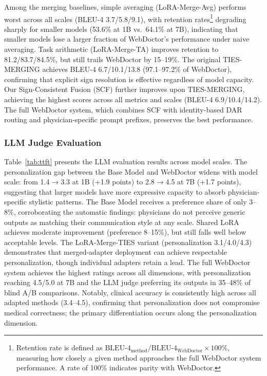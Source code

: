 Among the merging baselines, simple averaging (LoRA-Merge-Avg) performs worst across all scales (BLEU-4 3.7/5.8/9.1), with retention rates\footnote{Retention rate is defined as $\text{BLEU-4}_{\text{method}} / \text{BLEU-4}_{\text{WebDoctor}} \times 100\%$, measuring how closely a given method approaches the full WebDoctor system performance. A rate of 100\% indicates parity with WebDoctor.} degrading sharply for smaller models (53.6\% at 1B vs.\ 64.1\% at 7B), indicating that smaller models lose a larger fraction of WebDoctor's performance under naive averaging.
Task arithmetic (LoRA-Merge-TA) improves retention to 81.2/83.7/84.5\%, but still trails WebDoctor by 15--19\%.
The original TIES-MERGING achieves BLEU-4 6.7/10.1/13.8 (97.1--97.2\% of WebDoctor), confirming that explicit sign resolution is effective regardless of model capacity.
Our Sign-Consistent Fusion (SCF) further improves upon TIES-MERGING, achieving the highest scores across all metrics and scales (BLEU-4 6.9/10.4/14.2).
The full WebDoctor system, which combines SCF with identity-based DAR routing and physician-specific prompt prefixes, preserves the best performance.

\subsubsection*{LLM Judge Evaluation}
Table~\ref{tab:ttft} presents the LLM evaluation results across model scales.
The personalization gap between the Base Model and WebDoctor widens with model scale: from 1.4$\rightarrow$3.3 at 1B (+1.9 points) to 2.8$\rightarrow$4.5 at 7B (+1.7 points), suggesting that larger models have more expressive capacity to absorb physician-specific stylistic patterns.
The Base Model receives a preference share of only 3--8\%, corroborating the automatic findings: physicians do not perceive generic outputs as matching their communication style at any scale.
Shared LoRA achieves moderate improvement (preference 8--15\%), but still falls well below acceptable levels.
The LoRA-Merge-TIES variant (personalization 3.1/4.0/4.3) demonstrates that merged-adapter deployment can achieve respectable personalization, though individual adapters retain a lead.
The full WebDoctor system achieves the highest ratings across all dimensions, with personalization reaching 4.5/5.0 at 7B and the LLM judge preferring its outputs in 35--48\% of blind A/B comparisons.
Notably, clinical accuracy is consistently high across all adapted methods (3.4--4.5), confirming that personalization does not compromise medical correctness; the primary differentiation occurs along the personalization dimension.

